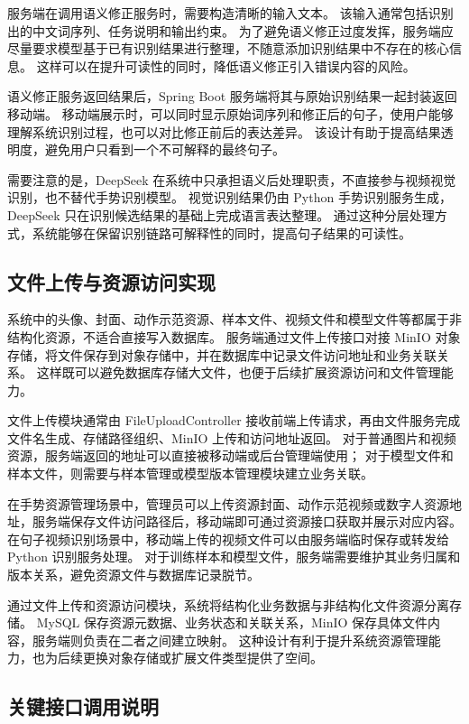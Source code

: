 服务端在调用语义修正服务时，需要构造清晰的输入文本。
该输入通常包括识别出的中文词序列、任务说明和输出约束。
为了避免语义修正过度发挥，服务端应尽量要求模型基于已有识别结果进行整理，不随意添加识别结果中不存在的核心信息。
这样可以在提升可读性的同时，降低语义修正引入错误内容的风险。

语义修正服务返回结果后，Spring Boot 服务端将其与原始识别结果一起封装返回移动端。
移动端展示时，可以同时显示原始词序列和修正后的句子，使用户能够理解系统识别过程，也可以对比修正前后的表达差异。
该设计有助于提高结果透明度，避免用户只看到一个不可解释的最终句子。

需要注意的是，DeepSeek 在系统中只承担语义后处理职责，不直接参与视频视觉识别，也不替代手势识别模型。
视觉识别结果仍由 Python 手势识别服务生成，DeepSeek 只在识别候选结果的基础上完成语言表达整理。
通过这种分层处理方式，系统能够在保留识别链路可解释性的同时，提高句子结果的可读性。

\subsection{文件上传与资源访问实现}

系统中的头像、封面、动作示范资源、样本文件、视频文件和模型文件等都属于非结构化资源，不适合直接写入数据库。
服务端通过文件上传接口对接 MinIO 对象存储，将文件保存到对象存储中，并在数据库中记录文件访问地址和业务关联关系。
这样既可以避免数据库存储大文件，也便于后续扩展资源访问和文件管理能力。

文件上传模块通常由 FileUploadController 接收前端上传请求，再由文件服务完成文件名生成、存储路径组织、MinIO 上传和访问地址返回。
对于普通图片和视频资源，服务端返回的地址可以直接被移动端或后台管理端使用；
对于模型文件和样本文件，则需要与样本管理或模型版本管理模块建立业务关联。

在手势资源管理场景中，管理员可以上传资源封面、动作示范视频或数字人资源地址，服务端保存文件访问路径后，移动端即可通过资源接口获取并展示对应内容。
在句子视频识别场景中，移动端上传的视频文件可以由服务端临时保存或转发给 Python 识别服务处理。
对于训练样本和模型文件，服务端需要维护其业务归属和版本关系，避免资源文件与数据库记录脱节。

通过文件上传和资源访问模块，系统将结构化业务数据与非结构化文件资源分离存储。
MySQL 保存资源元数据、业务状态和关联关系，MinIO 保存具体文件内容，服务端则负责在二者之间建立映射。
这种设计有利于提升系统资源管理能力，也为后续更换对象存储或扩展文件类型提供了空间。

\subsection{关键接口调用说明}

